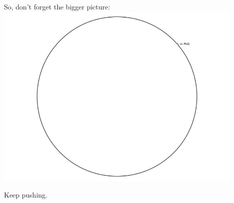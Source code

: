 \documentclass{beamer}
\begin{document}
\begin{frame}
	So, don't forget the bigger picture:
	\center\includegraphics[width=0.9\textwidth]{figures/fig_12}
\end{frame}

\begin{frame}
	\huge{Keep pushing.}
	
	\vfill
	
\end{frame}
\end{document}
